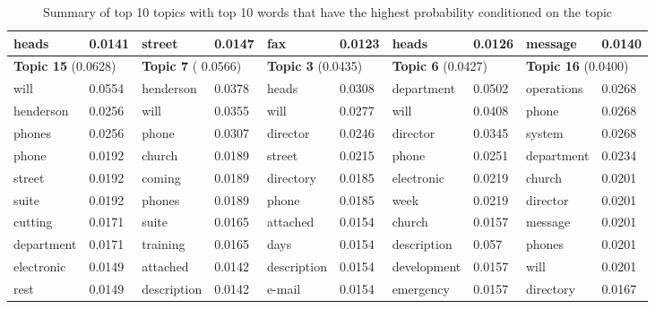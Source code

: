 \documentclass[a4paper]{article}
\begin{document}
\begin{table}[ht]
{\begin{tabular}{|l|l||l|l||l|l||l|l||l|l|}
		\scriptsize heads&\scriptsize 0.0141&\scriptsize street&\scriptsize  0.0147&\scriptsize fax&\scriptsize 0.0123&\scriptsize heads&\scriptsize 0.0126&\scriptsize message&\scriptsize0.0140\\
		\hline\hline
	\multicolumn{2}{|l||}{\textbf{Topic 15} (0.0628)}&\multicolumn{2}{l||}{\textbf{Topic 7} ( 0.0566)}&\multicolumn{2}{l||}{\textbf{Topic 3} (0.0435)}&\multicolumn{2}{l||}{\textbf{Topic 6} (0.0427)}&\multicolumn{2}{l|}{\textbf{Topic 16} (0.0400)}\\
	\hline\hline
	\scriptsize will&\scriptsize 0.0554&\scriptsize henderson&\scriptsize 0.0378&\scriptsize heads&\scriptsize 0.0308&\scriptsize department&\scriptsize 0.0502&\scriptsize operations&\scriptsize 0.0268\\
	\scriptsize henderson&\scriptsize 0.0256&\scriptsize will&\scriptsize  0.0355&\scriptsize will&\scriptsize 0.0277&\scriptsize will&\scriptsize 0.0408&\scriptsize phone&\scriptsize 0.0268\\
	\scriptsize phones&\scriptsize 0.0256&\scriptsize phone&\scriptsize 0.0307&\scriptsize director&\scriptsize 0.0246&\scriptsize director&\scriptsize 0.0345&\scriptsize system&\scriptsize 0.0268\\
	\scriptsize phone&\scriptsize 0.0192&\scriptsize church&\scriptsize 0.0189&\scriptsize street&\scriptsize 0.0215&\scriptsize phone&\scriptsize 0.0251&\scriptsize department&\scriptsize 0.0234\\
	\scriptsize street&\scriptsize 0.0192&\scriptsize coming&\scriptsize 0.0189&\scriptsize directory&\scriptsize 0.0185&\scriptsize electronic&\scriptsize 0.0219&\scriptsize church&\scriptsize 0.0201\\
	\scriptsize suite&\scriptsize 0.0192&\scriptsize phones&\scriptsize 0.0189&\scriptsize phone&\scriptsize 0.0185&\scriptsize week&\scriptsize 0.0219&\scriptsize director&\scriptsize 0.0201\\
	\scriptsize cutting&\scriptsize 0.0171&\scriptsize suite&\scriptsize 0.0165&\scriptsize  attached&\scriptsize 0.0154&\scriptsize church&\scriptsize 0.0157&\scriptsize message&\scriptsize 0.0201\\
	\scriptsize department&\scriptsize 0.0171&\scriptsize training&\scriptsize 0.0165&\scriptsize days&\scriptsize 0.0154&\scriptsize description&\scriptsize 0.057&\scriptsize phones&\scriptsize 0.0201\\
	\scriptsize electronic&\scriptsize 0.0149&\scriptsize  attached&\scriptsize 0.0142&\scriptsize description&\scriptsize 0.0154&\scriptsize development&\scriptsize 0.0157&\scriptsize will&\scriptsize 0.0201\\
	\scriptsize rest&\scriptsize 0.0149&\scriptsize description&\scriptsize  0.0142&\scriptsize e-mail&\scriptsize 0.0154&\scriptsize emergency&\scriptsize 0.0157&\scriptsize directory&\scriptsize0.0167\\
	\hline
		\end{tabular}}
	\caption {Summary of top 10 topics with top 10 words that have the highest probability conditioned on the topic}
	\label{table:VancewordsMCMC}
\end{table}
\end{document}
